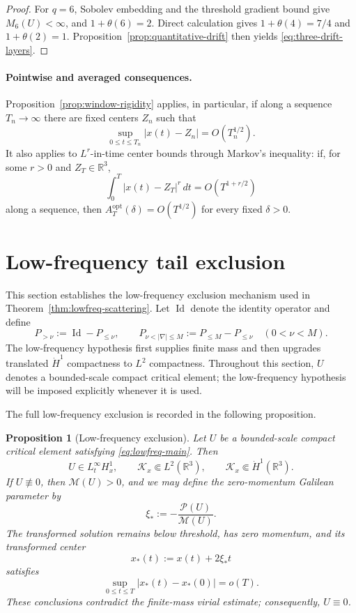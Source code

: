 \documentclass[preprint,12pt]{elsarticle}
\numberwithin{equation}{section}
\newtheorem{proposition}[theorem]{Proposition}
\theoremstyle{remark}
\newcommand{\R}{\mathbb R}
\newcommand{\dd}{\,d}
\newcommand{\Aopt}{A^{\mathrm{opt}}}
\newcommand{\Mcal}{\mathcal M}
\newcommand{\Pcal}{\mathcal P}
\begin{document}
\begin{proof}
For $q=6$, Sobolev embedding and the threshold gradient bound give $M_6(U)<\infty$, and $1+\theta(6)=2$. Direct calculation gives $1+\theta(4)=7/4$ and $1+\theta(2)=1$. Proposition~\ref{prop:quantitative-drift} then yields \eqref{eq:three-drift-layers}.
\end{proof}

\paragraph{Pointwise and averaged consequences.}
Proposition~\ref{prop:window-rigidity} applies, in particular, if along a sequence $T_n\to\infty$ there are fixed centers $Z_n$ such that
\[
  \sup_{0\le t\le T_n}|x(t)-Z_n|=O(T_n^{1/2}).
\]
It also applies to $L^r$-in-time center bounds through Markov's inequality: if, for some $r>0$ and $Z_T\in\R^3$,
\[
  \int_0^T|x(t)-Z_T|^r\dd t=O(T^{1+r/2})
\]
along a sequence, then $\Aopt_T(\delta)=O(T^{1/2})$ for every fixed $\delta>0$.

\section{Low-frequency tail exclusion}

This section establishes the low-frequency exclusion mechanism used in Theorem~\ref{thm:lowfreq-scattering}. Let $\operatorname{Id}$ denote the identity operator and define
\[
  P_{>\nu}:=\operatorname{Id}-P_{\le\nu},
  \qquad
  P_{\nu<|\nabla|\le M}:=P_{\le M}-P_{\le\nu}
  \quad(0<\nu<M).
\]
The low-frequency hypothesis first supplies finite mass and then upgrades translated $\dot H^1$ compactness to $L^2$ compactness. Throughout this section, $U$ denotes a bounded-scale compact critical element; the low-frequency hypothesis will be imposed explicitly whenever it is used.

The full low-frequency exclusion is recorded in the following proposition.
\begin{proposition}[Low-frequency exclusion]\label{prop:lowfreq-rigidity}
Let $U$ be a bounded-scale compact critical element satisfying \eqref{eq:lowfreq-main}. Then
\begin{equation}\label{eq:lowfreq-conclusions-intro}
  U\in L_t^\infty H_x^1,
  \qquad
  \mathcal K_x\Subset L^2(\R^3),
  \qquad
  \mathcal K_x\Subset\dot H^1(\R^3).
\end{equation}
If $U\not\equiv0$, then $\Mcal(U)>0$, and we may define the zero-momentum Galilean parameter by
\begin{equation}\label{eq:zero-momentum-xi-intro}
  \xi_*:=-\frac{\Pcal(U)}{\Mcal(U)}.
\end{equation}
The transformed solution remains below threshold, has zero momentum, and its transformed center
\[
  x_*(t):=x(t)+2\xi_*t
\]
satisfies
\begin{equation}\label{eq:sublinear-center-intro}
  \sup_{0\le t\le T}|x_*(t)-x_*(0)|=o(T).
\end{equation}
These conclusions contradict the finite-mass virial estimate; consequently, $U\equiv0$.
\end{proposition}
\end{document}
